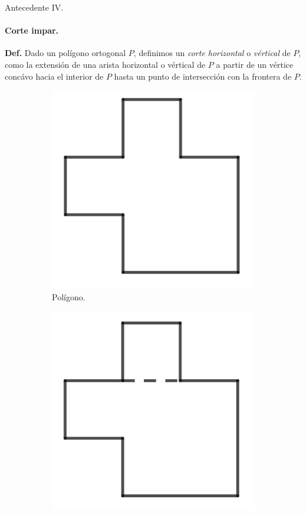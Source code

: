 \begin{frame}{Antecedente IV.} %
  \framesubtitle{Corte impar.} %
  \textbf{Def.} Dado un polígono ortogonal $P$, definimos un \textit{corte horizontal} o \textit{vértical}
  de $P$, como la extensión de una arista horizontal o vértical de $P$ a partir de un vértice concávo hacia
  el interior de $P$ hasta un punto de intersección con la frontera de $P$.
  \begin{figure}
    \centering
    \begin{subfigure}[b]{0.2\paperwidth}
      \includegraphics[width=0.1\paperwidth]{./images/Fig.png}
      \caption*{Polígono.}
    \end{subfigure}
    \begin{subfigure}[b]{0.2\paperwidth}
      \includegraphics[width=0.1\paperwidth]{./images/FigCH.png}

\end{subfigure}
\end{figure}
\end{frame}
